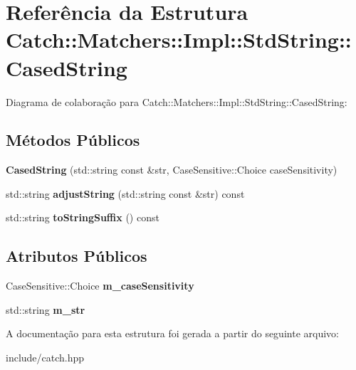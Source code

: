 \hypertarget{structCatch_1_1Matchers_1_1Impl_1_1StdString_1_1CasedString}{}\section{Referência da Estrutura Catch\+:\+:Matchers\+:\+:Impl\+:\+:Std\+String\+:\+:Cased\+String}
\label{structCatch_1_1Matchers_1_1Impl_1_1StdString_1_1CasedString}


Diagrama de colaboração para Catch\+:\+:Matchers\+:\+:Impl\+:\+:Std\+String\+:\+:Cased\+String\+:
\subsection*{Métodos Públicos}
\begin{DoxyCompactItemize}
\item 
{\bfseries Cased\+String} (std\+::string const \&str, Case\+Sensitive\+::\+Choice case\+Sensitivity)\hypertarget{structCatch_1_1Matchers_1_1Impl_1_1StdString_1_1CasedString_aebd017c88423d8a11c62cff85754a22d}{}\label{structCatch_1_1Matchers_1_1Impl_1_1StdString_1_1CasedString_aebd017c88423d8a11c62cff85754a22d}

\item 
std\+::string {\bfseries adjust\+String} (std\+::string const \&str) const \hypertarget{structCatch_1_1Matchers_1_1Impl_1_1StdString_1_1CasedString_aaf5c4be8b3b8b317777d0e332d3733b5}{}\label{structCatch_1_1Matchers_1_1Impl_1_1StdString_1_1CasedString_aaf5c4be8b3b8b317777d0e332d3733b5}

\item 
std\+::string {\bfseries to\+String\+Suffix} () const \hypertarget{structCatch_1_1Matchers_1_1Impl_1_1StdString_1_1CasedString_ae5865fa1dd20c80498a094cae5459883}{}\label{structCatch_1_1Matchers_1_1Impl_1_1StdString_1_1CasedString_ae5865fa1dd20c80498a094cae5459883}

\end{DoxyCompactItemize}
\subsection*{Atributos Públicos}
\begin{DoxyCompactItemize}
\item 
Case\+Sensitive\+::\+Choice {\bfseries m\+\_\+case\+Sensitivity}\hypertarget{structCatch_1_1Matchers_1_1Impl_1_1StdString_1_1CasedString_af399ed93051d8981e298206dee6898b3}{}\label{structCatch_1_1Matchers_1_1Impl_1_1StdString_1_1CasedString_af399ed93051d8981e298206dee6898b3}

\item 
std\+::string {\bfseries m\+\_\+str}\hypertarget{structCatch_1_1Matchers_1_1Impl_1_1StdString_1_1CasedString_a9f8ce063a934330ac59bf8638f047e99}{}\label{structCatch_1_1Matchers_1_1Impl_1_1StdString_1_1CasedString_a9f8ce063a934330ac59bf8638f047e99}

\end{DoxyCompactItemize}


A documentação para esta estrutura foi gerada a partir do seguinte arquivo\+:\begin{DoxyCompactItemize}
\item 
include/catch.\+hpp\end{DoxyCompactItemize}
